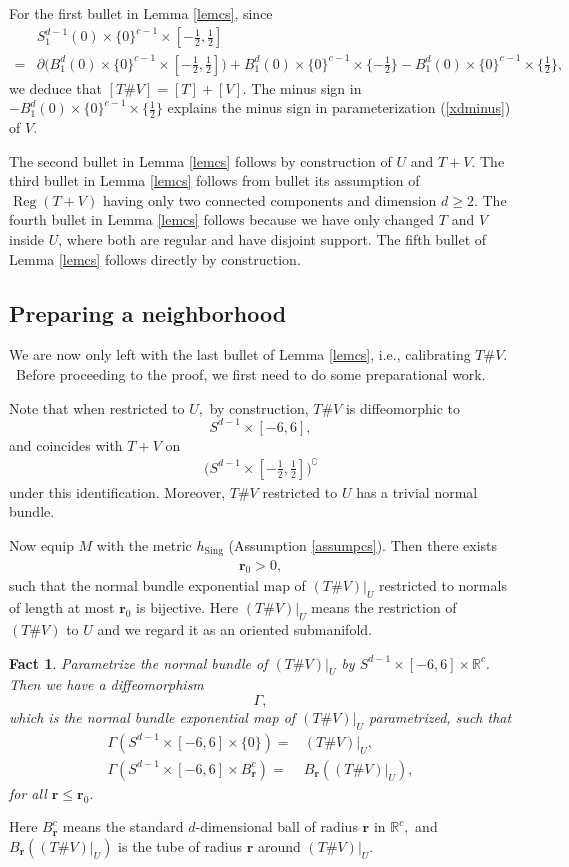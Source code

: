 \documentclass[11pt,a4paper]{amsart}
\numberwithin{equation}{section}
\newcommand{\reg}{{\operatorname{Reg}}}
\newcommand{\sing}{{\operatorname{Sing}}}
\newcommand{\Ga}{\Gamma}
\newcommand{\cp}{^\complement}
\newcommand{\pd}{\partial}
\newcommand{\mfr}{{\mathbf{r}}}
\newcommand{\tvu}{(T\#V)|_U}
\newcommand{\R}{\mathbb{R}}
\theoremstyle{plain}
\newtheorem{fact}[exam]{Fact}
\theoremstyle{definition}
\numberwithin{equation}{subsection}
\begin{document}
	For the first bullet in Lemma \ref{lemcs}, since
	\begin{align*}
		&	S_1^{d-1}(0)\times \{0\}^{c-1}\times [-\frac{1}{2},\frac{1}{2}]\\=&\pd\bigg(B_1^d(0)\times\{0\}^{c-1}\times [-\frac{1}{2},\frac{1}{2}]\bigg)	+B_1^d(0)\times\{0\}^{c-1}\times\{-\frac{1}{2}\}-B_1^d(0)\times\{0\}^{c-1}\times\{\frac{1}{2}\},
	\end{align*}we deduce that $[T\# V]=[T]+[V]$. The minus sign in $-B_1^d(0)\times\{0\}^{c-1}\times\{\frac{1}{2}\}$ explains the minus sign in parameterization (\ref{xdminus}) of $V$.
	
	The second bullet in Lemma \ref{lemcs} follows by construction of $U$ and $T+V.$ The third bullet in Lemma \ref{lemcs} follows from bullet its assumption of $\reg(T+V)$ having only two connected components and dimension $d\ge 2$. The fourth bullet in Lemma \ref{lemcs} follows because we have only changed $T$ and $V$ inside $U$, where both are regular and have disjoint support. The fifth bullet of Lemma \ref{lemcs} follows directly by construction.
	\subsection{Preparing a neighborhood}
	We are now only left with the last bullet of Lemma \ref{lemcs}, i.e., calibrating $T\# V.$  Before proceeding to the proof, we first need to do some preparational work.
	
	Note that when restricted to $U,$ by construction, $T\# V$ is diffeomorphic to $$S^{d-1}\times[-6,6],$$ and coincides with $T+V$ on 
	\begin{align}\label{sdi}
		\bigg(S^{d-1}\times[-\frac{1}{2},\frac{1}{2}]\bigg)\cp
	\end{align} under this identification. Moreover, $T\# V$ restricted to $U$ has a trivial normal bundle.
	
	Now equip $M$ with the metric $h_\sing$ (Assumption \ref{assumpcs}). Then there exists 
	\begin{align*}
		\mathbf{r}_0>0,
	\end{align*} such that the normal bundle exponential map of $\tvu$ restricted to normals of length at most $\mathbf{r}_0$ is bijective. Here $(T\# V)|_U$ means the restriction of $(T\# V)$ to $U$ and we regard it as an oriented submanifold.
	\begin{fact}\label{fctga}
		Parametrize the normal bundle of $\tvu$ by $S^{d-1}\times[-6,6]\times \R^c.$ Then we have a diffeomorphism $$\Ga,$$ which is the normal bundle exponential map of $\tvu$ parametrized, such that
		\begin{align}
			\Ga(S^{d-1}\times[-6,6]\times\{0\})=&(T\#V)|_U,\\
			\Ga(S^{d-1}\times[-6,6]\times B_{\mfr}^c)=&B_{\mfr}((T\#V)|_U),
		\end{align} for all $\mfr\le \mfr_0.$
	\end{fact}Here $B_{\mfr}^c$ means the standard $d$-dimensional ball of radius $\mfr$ in $\R^c,$ and $B_{\mfr}((T\#V)|_U)$ is the tube of radius $\mfr$ around $(T\#V)|_U.$
	
\end{document}
